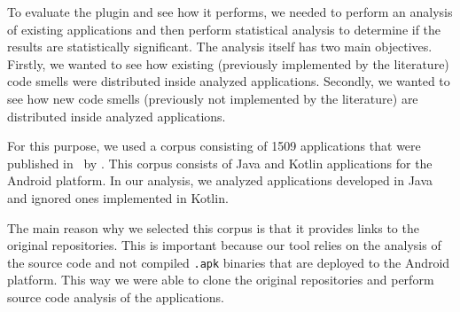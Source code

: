 
To evaluate the plugin and see how it performs, we needed to perform an analysis of existing applications and then
perform statistical analysis to determine if the results are statistically significant.
The analysis itself has two main objectives.
Firstly, we wanted to see how existing (previously implemented by the literature) code smells were distributed
inside analyzed applications.
Secondly, we wanted to see how new code smells (previously not implemented by the literature) are distributed
inside analyzed applications.


For this purpose, we used a corpus consisting of 1509 applications that were published in~\cite{kotlin_android_corpus} by
\citeauthor{kotlin_android_corpus}.
This corpus consists of Java and Kotlin applications for the Android platform.
In our analysis, we analyzed applications developed in Java and ignored ones implemented in Kotlin.

The main reason why we selected this corpus is that it provides links to the original repositories.
This is important because our tool relies on the analysis of the source code and not compiled \verb|.apk| binaries
that are deployed to the Android platform.
This way we were able to clone the original repositories and perform source code analysis of the applications.
